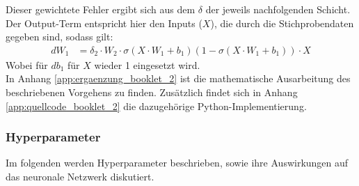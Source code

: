 Dieser gewichtete Fehler ergibt sich aus dem $\delta$ der jeweils nachfolgenden Schicht. Der Output-Term entspricht hier den Inputs ($X$), die durch die Stichprobendaten gegeben sind, sodass gilt:
\begin{align*}
dW_{1} &= \delta_{2}\cdot W_{2} \cdot \sigma(X\cdot W_{1}+b_{1})(1- \sigma(X\cdot W_{1}+b_{1})) \cdot X
\end{align*}
\noindent \hspace*{7mm}
Wobei für $db_{1}$ für $X$ wieder 1 eingesetzt wird.\\
\noindent \hspace*{7mm}
In Anhang \ref{app:ergaenzung_booklet_2} ist die mathematische Ausarbeitung des beschriebenen Vorgehens zu finden. Zusätzlich findet sich in Anhang \ref{app:quellcode_booklet_2} die dazugehörige Python-Implementierung.
\subsubsection{Hyperparameter}
Im folgenden werden Hyperparameter beschrieben, sowie ihre Auswirkungen auf das neuronale Netzwerk diskutiert.
